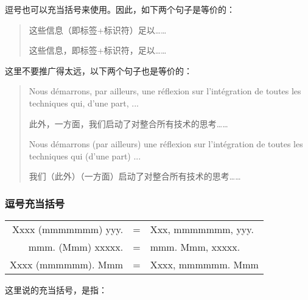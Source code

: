 逗号也可以充当括号来使用。因此，如下两个句子是等价的：

\begin{quote}
    这些信息（即标签+标识符）足以……

    这些信息，即标签+标识符，足以……
\end{quote}

这里不要推广得太远，以下两个句子也是等价的：

\begin{quote}
    Nous démarrons, par ailleurs, une réflexion sur l'intégration de toutes les techniques qui, d'une part, ...

    \begin{bil}
        此外，一方面，我们启动了对整合所有技术的思考……
    \end{bil}

    Nous démarrons (par ailleurs) une réflexion sur l'intégration de toutes les techniques qui (d'une part) ...

    \begin{bil}
        我们（此外）（一方面）启动了对整合所有技术的思考……
    \end{bil}
\end{quote}

\begin{mdframed}
    \subsubsection*{逗号充当括号}

    \begin{tabular}{rcl}
        Xxxx (mmmmmmm) yyy. & = & Xxx, mmmmmmm, yyy.\\
        mmm. (Mmm) xxxxx. & = & mmm. Mmm, xxxxx.\\
        Xxxx (mmmmmm). Mmm & = & Xxxx, mmmmmm. Mmm
    \end{tabular}
\end{mdframed}

这里说的充当括号，是指：


